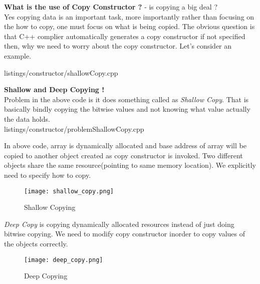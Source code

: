 \documentclass[oops.tex]{subfiles}
\begin{document}
\begin{enumerate}
          {\bf What is the use of Copy Constructor ?} - is copying a big deal ?\\
          Yes copying data is an important task, more importantly rather than
          focusing on the how to copy, one must focus on what is being copied. 
          The obvious question is that C++ complier automatically generates a
          copy constructor if not specified then, why we need to worry about
          the copy constructor. Let's consider an example. 
        
          
          {listings/constructor/shallowCopy.cpp}
            
          {\bf Shallow and Deep Copying !}  \\
          Problem in the above code is it does something called as
          \emph{Shallow Copy}. That is basically bindly copying the bitwise
          values and not knowing what value actually the data holds.\\
           
          
          {listings/constructor/problemShallowCopy.cpp}
            
          In above code, array is dynamically allocated and base address 
          of array will be copied to another object created as copy
          constructor is invoked. Two different objects share the same 
          resource(pointing to same memory location). We explicitly need 
          to specify how to copy. 
                    
          \begin{figure}[h]
                \begin{center}
                    \caption{Shallow Copying} 
                    \texttt{[image: shallow\_copy.png]}
                \end{center}
          \end{figure}
            
          \emph{Deep Copy} is copying dynamically allocated resources instead 
          of just doing bitwise copying. We need to modify copy constructor 
          inorder to copy values of the objects correctly. 
 
          \begin{figure}[h]
                \begin{center}
                    \caption{Deep Copying} 
                    \texttt{[image: deep\_copy.png]}
                \end{center}
          \end{figure}


\end{enumerate}
\end{document}
